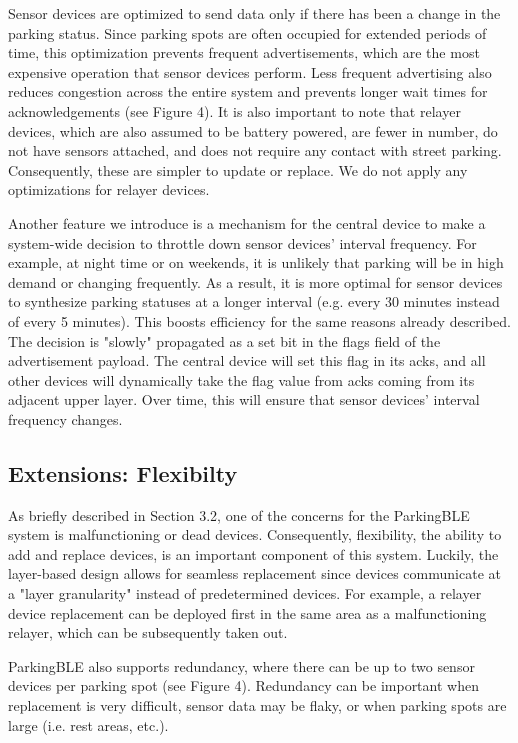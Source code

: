 \documentclass[sigconf]{acmart}
\begin{document}
Sensor devices are optimized to send data only if there has been a change in the
parking status. Since parking spots are often occupied for extended periods of
time, this optimization prevents frequent advertisements, which are the most
expensive operation that sensor devices perform. Less frequent advertising also
reduces congestion across the entire system and prevents longer wait times for
acknowledgements (see Figure 4). It is also important to note that relayer devices, which
are also assumed to be battery powered, are fewer in number, do not have
sensors attached, and does not require any contact with street parking.
Consequently, these are simpler to update or replace. We do not apply any
optimizations for relayer devices. \newline

Another feature we introduce is a mechanism for the central device to make a
system-wide decision to throttle down sensor devices' interval frequency. For
example, at night time or on weekends, it is unlikely that parking will be
in high demand or changing frequently. As a result, it is more optimal for
sensor devices to synthesize parking statuses at a longer interval (e.g. every
30 minutes instead of every 5 minutes). This boosts efficiency for the same
reasons already described. The decision is "slowly" propagated as a set bit
in the flags field of the advertisement payload. The central device will set
this flag in its acks, and all other devices will dynamically take the
flag value from acks coming from its adjacent upper layer. Over time, this will
ensure that sensor devices' interval frequency changes.


\subsection{Extensions: Flexibilty}
As briefly described in Section 3.2, one of the concerns for the ParkingBLE
system is malfunctioning or dead devices. Consequently, flexibility, the
ability to add and replace devices, is an important component of this system.
Luckily, the layer-based design allows for seamless replacement since devices
communicate at a "layer granularity" instead of predetermined devices. For
example, a relayer device replacement can be deployed first in the same area
as a malfunctioning relayer, which can be subsequently taken out. \newline

ParkingBLE also supports redundancy, where there can be up to two sensor
devices per parking spot (see Figure 4). Redundancy can be important when replacement is
very difficult, sensor data may be flaky, or when parking spots are large (i.e.
rest areas, etc.).
\end{document}
